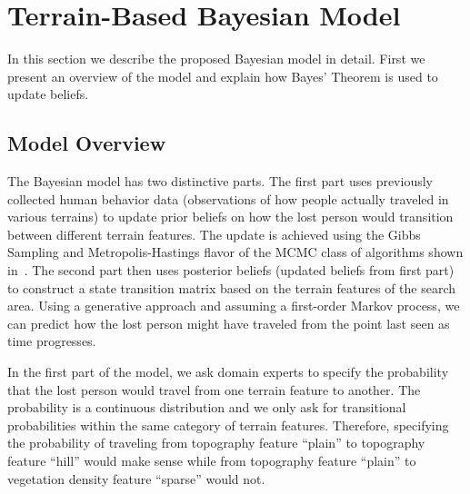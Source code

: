 \documentclass[smallextended,natbib]{svjour3}
\begin{document}
\section{Terrain-Based Bayesian Model}
\label{sec:3}

In this section we describe the proposed Bayesian model in detail. First we present an overview of the model and explain how Bayes' Theorem is used to update beliefs.

\subsection{Model Overview}
\label{sec:3.1}

The Bayesian model has two distinctive parts. The first part uses previously collected human behavior data (observations of how people actually traveled in various terrains) to update prior beliefs on how the lost person would transition between different terrain features. The update is achieved using the Gibbs Sampling and Metropolis-Hastings flavor of the MCMC class of algorithms shown in~\cite{textbook}. The second part then uses posterior beliefs (updated beliefs from first part) to construct a state transition matrix based on the terrain features of the search area. Using a generative approach and assuming a first-order Markov process, we can predict how the lost person might have traveled from the point last seen as time progresses.

In the first part of the model, we ask domain experts to specify the probability that the lost person would travel from one terrain feature to another. The probability is a continuous distribution and we only ask for transitional probabilities within the same category of terrain features. Therefore, specifying the probability of traveling from topography feature ``plain'' to topography feature ``hill'' would make sense while from topography feature ``plain'' to vegetation density feature ``sparse'' would not.
\end{document}
